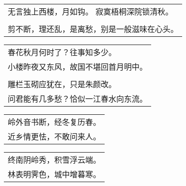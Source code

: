 \nopagebreak%
\nopagebreak%
\noindent\begin{minipage}{\linewidth}
  \vskip-3pt\begin{table}[H]
    \centering
    \begin{tabular}{@{}l@{}}
无言独上西楼，月如钩。 寂寞梧桐深院锁清秋。\\
\\
剪不断，理还乱，是离愁，别是一般滋味在心头。
    \end{tabular}
  \end{table}
\end{minipage}
\vspace{1cm}


\nopagebreak%
\nopagebreak%
\noindent\begin{minipage}{\linewidth}
  \vskip-3pt\begin{table}[H]
    \centering
    \begin{tabular}{@{}l@{}}
春花秋月何时了？往事知多少。\\
小楼昨夜又东风，故国不堪回首月明中。\\
\\
雕栏玉砌应犹在，只是朱颜改。\\
问君能有几多愁？恰似一江春水向东流。
    \end{tabular}
  \end{table}
\end{minipage}
\vspace{1cm}


\nopagebreak%
\nopagebreak%
\noindent\begin{minipage}{\linewidth}
  \vskip-3pt\begin{table}[H]
    \centering
    \begin{tabular}{@{}l@{}}
岭外音书断，经冬复历春。\\
近乡情更怯，不敢问来人。
    \end{tabular}
  \end{table}
\end{minipage}
\vspace{1cm}


\nopagebreak%
\nopagebreak%
\noindent\begin{minipage}{\linewidth}
  \vskip-3pt\begin{table}[H]
    \centering
    \begin{tabular}{@{}l@{}}
终南阴岭秀，积雪浮云端。\\
林表明霁色，城中增暮寒。
    \end{tabular}
  \end{table}
\end{minipage}
\vspace{1cm}


